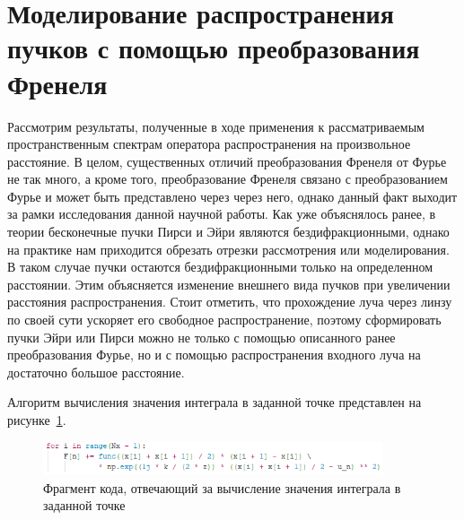     \section[Моделирование распространения пучков с помощью преобразования Френеля]{\nohyphens{Моделирование распространения пучков с помощью преобразования Френеля}}{


    \vspace{-0.2cm}
    Рассмотрим результаты, полученные в ходе применения к рассматриваемым пространственным спектрам оператора
    распространения на произвольное расстояние. В целом, существенных отличий преобразования Френеля от Фурье не так много,
    а кроме того, преобразование Френеля связано с преобразованием Фурье и может быть представлено через через него,
    однако данный факт выходит за рамки исследования данной научной работы.
    Как уже объяснялось ранее, в теории бесконечные пучки Пирси и Эйри являются бездифракционными,
    однако на практике нам приходится обрезать отрезки рассмотрения или моделирования.
    В таком случае пучки остаются бездифракционными только на определенном расстоянии.
    Этим объясняется изменение внешнего вида пучков при увеличении расстояния распространения.
    Стоит отметить, что прохождение луча через линзу по своей сути ускоряет его свободное распространение,
    поэтому сформировать пучки Эйри или Пирси можно не только с помощью описанного ранее преобразования Фурье,
    но и с помощью распространения входного луча на достаточно большое расстояние.

    Алгоритм вычисления значения интеграла в заданной точке представлен на рисунке~\ref{listing}.
    \begin{figure}[H]
        \begin{center}
            \includegraphics[width=10cm]{plots/listing}
            \caption{Фрагмент кода, отвечающий за вычисление значения интеграла в заданной точке}
            \label{listing}
        \end{center}
    \end{figure}

}
